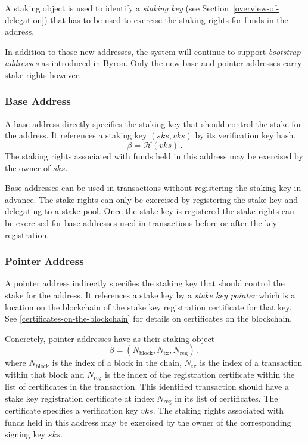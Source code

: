 \documentclass[11pt,a4paper,dvipsnames,twosided]{article}
\begin{document}
A staking object is used to identify a \emph{staking key} (see
Section~\ref{overview-of-delegation}) that has to be used to exercise the
staking rights for funds in the address.

In addition to those new addresses, the system will continue to support
\emph{bootstrap addresses} as introduced in Byron. Only the new base
and pointer addresses carry stake rights however.

\subsubsection{Base Address}
\label{base-address}

A base address directly specifies the staking key that should
control the stake for the address. It references a staking key
\((sks, vks)\) by its verification key hash.
\[
\beta = \mathcal{H}(vks)\,.
\]
The staking rights associated with funds held in this address may be
exercised by the owner of \(sks\).

Base addresses can be used in transactions without registering the
staking key in advance. The stake rights can only be exercised by
registering the stake key and delegating to a stake pool. Once the
stake key is registered the stake rights can be exercised for base
addresses used in transactions before or after the key registration.

\subsubsection{Pointer Address}
\label{pointer-address}

A pointer address indirectly specifies the staking key that should
control the stake for the address. It references a stake key by a
\emph{stake key pointer} which is a location on the blockchain of the
stake key registration certificate for that key. See
\cref{certificates-on-the-blockchain} for details on certificates on the
blockchain.

Concretely, pointer addresses have as their staking object
\[
\beta = (N_\text{block}, N_\text{tx}, N_\text{reg})\,,
\]
where \(N_\text{block}\) is the index of a block in the chain,
\(N_\text{tx}\) is the index of a transaction within that block and
\(N_\text{reg}\) is the index of the registration certificate within
the list of certificates in the transaction. This identified
transaction should have a stake key registration certificate at
index \(N_\text{reg}\) in its list of certificates. The certificate
specifies a verification key \(vks\). The staking rights associated
with funds held in this address may be exercised by the owner of the
corresponding signing key \(sks\).
\end{document}
